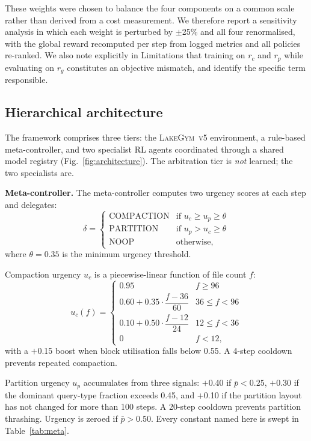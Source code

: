 \documentclass[fleqn,10pt]{wlscirep}
\newcommand{\env}{\textsc{LakeGym~v5}}
\begin{document}
These weights were chosen to balance the four components on a common
scale rather than derived from a cost measurement. We therefore report a
sensitivity analysis in which each weight is perturbed by $\pm$25\% and
all four renormalised, with the global reward recomputed per step from
logged metrics and all policies re-ranked. We also note explicitly in
Limitations that training on $r_c$ and $r_p$ while evaluating on $r_g$
constitutes an objective mismatch, and identify the specific term
responsible.

\FloatBarrier

\subsection*{Hierarchical architecture}

The framework comprises three tiers: the \env{} environment, a
rule-based meta-controller, and two specialist RL agents coordinated
through a shared model registry (Fig.~\ref{fig:architecture}). The
arbitration tier is \emph{not} learned; the two specialists are.

\textbf{Meta-controller.}
The meta-controller computes two urgency scores at each step and
delegates:
\begin{equation}
\delta = \begin{cases}
\text{COMPACTION} & \text{if } u_c \geq u_p \geq \theta \\
\text{PARTITION}  & \text{if } u_p > u_c \geq \theta \\
\text{NOOP}       & \text{otherwise,}
\end{cases}
\end{equation}
where $\theta = 0.35$ is the minimum urgency threshold.

Compaction urgency $u_c$ is a piecewise-linear function of file count $f$:
\begin{equation}
u_c(f) = \begin{cases}
0.95 & f \geq 96 \\[2pt]
0.60 + 0.35 \cdot \dfrac{f - 36}{60} & 36 \leq f < 96 \\[6pt]
0.10 + 0.50 \cdot \dfrac{f - 12}{24} & 12 \leq f < 36 \\[2pt]
0    & f < 12,
\end{cases}
\end{equation}
with a $+$0.15 boost when block utilisation falls below 0.55.
A 4-step cooldown prevents repeated compaction.

Partition urgency $u_p$ accumulates from three signals: $+$0.40 if
$\bar{p} < 0.25$, $+$0.30 if the dominant query-type fraction exceeds
0.45, and $+$0.10 if the partition layout has not changed for more than
100 steps. A 20-step cooldown prevents partition thrashing. Urgency is
zeroed if $\bar{p} > 0.50$. Every constant named here is swept in
Table~\ref{tab:meta}.
\end{document}
